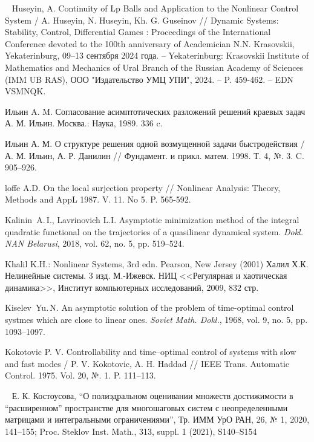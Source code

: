 \documentclass[../main.tex]{subfiles}
\begin{document}
\begin{thebibliography}{99}
 
Huseyin, A. Continuity of Lp Balls and Application to the Nonlinear Control System / A. Huseyin, N. Huseyin, Kh. G. Guseinov // Dynamic Systems: Stability, Control, Differential Games : Proceedings of the International Conference devoted to the 100th anniversary of Academician N.N. Krasovskii, Yekaterinburg, 09–13 сентября 2024 года. – Yekaterinburg: Krasovskii Institute of Mathematics and Mechanics of Ural Branch of the Russian Academy of Sciences (IMM UB RAS), ООО "Издательство УМЦ УПИ", 2024. – P. 459-462. – EDN VSMNQK.


Ильин A. M. Согласование асимптотических разложений решений краевых задач А. М. Ильин.  Москва.: Наука, 1989.  336 c.

Ильин А. М. О структуре решения одной возмущенной задачи быстродействия /А. М. Ильин, А. Р. Данилин // Фундамент. и прикл. матем. 1998. Т. 4, №. 3. C. 905–926.

loffe A.D. On the local surjection property // Nonlinear Analysis: Theory, Methods and AppL 1987. V. 11. No 5. P. 565-592.


Kalinin~A.\,I., Lavrinovich L.I. Asymptotic minimization method of the integral quadratic functional on
the trajectories of a quasilinear dynamical system. \emph{Dokl. NAN Belarusi}, 2018, vol. 62, no. 5, pp. 519–524.

Khalil K.H.: Nonlinear Systems, 3rd edn. Pearson, New Jersey (2001)
Халил Х.К. Нелинейные системы. 3 изд. М.-Ижевск. НИЦ <<Регулярная и хаотическая динамика>>, Институт компьютерных исследований, 2009, 832 стр.

Kiselev~Yu.\,N. An asymptotic solution of the problem of time-optimal control systmes which are close to
linear ones. \emph{Soviet Math. Dokl.}, 1968, vol. 9, no. 5, pp. 1093–1097.


Kokotovic P. V. Controllability and time–optimal control of systems with slow and fast modes / P. V. Kokotovic, A. H. Haddad // IEEE Trans. Automatic Control. 
1975.  Vol. 20, №. 1.  P. 111–113.

Е. К. Костоусова, “О полиэдральном оценивании множеств достижимости в “расширенном” пространстве для многошаговых систем с неопределенными матрицами и интегральными ограничениями”, Тр. ИММ УрО РАН, 26, № 1, 2020, 141–155; Proc. Steklov Inst. Math., 313, suppl. 1 (2021), S140–S154


\end{thebibliography}
\end{document}
